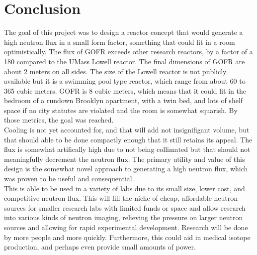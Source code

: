 \label{sec:conclusion}
\section{Conclusion}

The goal of this project was to design a reactor concept that would generate a high neutron flux in a small form factor, something that could fit in a room optimistically. The flux of GOFR exceeds other research reactors, by a factor of a 180 compared to the UMass Lowell reactor. The final dimensions of GOFR are about 2 meters on all sides. The size of the Lowell reactor is not publicly available but it is a swimming pool type reactor, which range from about 60 to 365 cubic meters. GOFR is 8 cubic meters, which means that it could fit in the bedroom of a rundown Brooklyn apartment, with a twin bed, and lots of shelf space if no city statutes are violated and the room is somewhat squarish. By those metrics, the goal was reached.\\

Cooling is not yet accounted for, and that will add not insignifigant volume, but that should able to be done compactly enough that it still retains its appeal. The flux is somewhat artifically high due to not being collimated but that should not meaningfully decrement the neutron flux. The primary utility and value of this design is the somewhat novel approach to generating a high neutron flux, which was proven to be useful and consequential.\\

This is able to be used in a variety of labs due to its small size, lower cost, and competitive neutron flux. This will fill the niche of cheap, affordable neutron sources for smaller research labs with limited funds or space and allow research into various kinds of neutron imaging, relieving the pressure on larger neutron sources and allowing for rapid experimental development. Research will be done by more people and more quickly. Furthermore, this could aid in medical isotope production, and perhaps even provide small amounts of power.\\